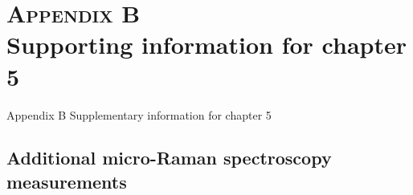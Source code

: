 
\chapter[Appendix B \hspace{0.0025em} Supplementary information for chapter 5]{\textsc{Appendix B} \vspace{8pt} \\ Supporting information for chapter 5}

\label{appendix:B}

\setcounter{chapter}{0}
\renewcommand{\thechapter}{\Alph{chapter}}
\renewcommand{\theHchapter}{B\thechapter}

\setcounter{section}{0}
\renewcommand{\thesection}{B.\arabic{section}}

\setcounter{figure}{0}
\renewcommand{\thefigure}{B.\arabic{figure}}

\setcounter{table}{0}
\renewcommand{\thetable}{B.\arabic{table}}

\updatemylotappendixB

{Appendix B \hspace{0.0025em} Supplementary information for chapter 5}

\regularsection
\headerspecialsectionappendix


\section{Additional micro-Raman spectroscopy measurements}

